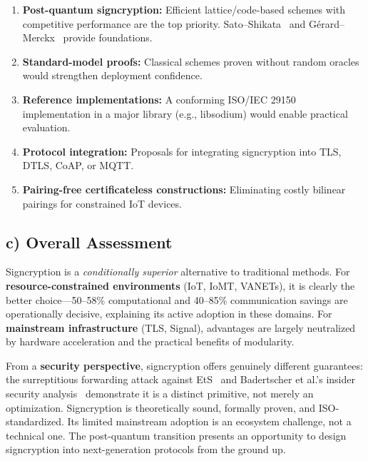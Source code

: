 \documentclass[11pt,a4paper]{article}
\begin{document}
\begin{enumerate}[label=\arabic*.]
    \item \textbf{Post-quantum signcryption:} Efficient lattice/code-based schemes with competitive performance are the top priority. Sato--Shikata~\cite{sato2018} and G\'{e}rard--Merckx~\cite{gerard2018} provide foundations.
    \item \textbf{Standard-model proofs:} Classical schemes proven without random oracles would strengthen deployment confidence.
    \item \textbf{Reference implementations:} A conforming ISO/IEC 29150~\cite{iso29150} implementation in a major library (e.g., libsodium) would enable practical evaluation.
    \item \textbf{Protocol integration:} Proposals for integrating signcryption into TLS, DTLS, CoAP, or MQTT.
    \item \textbf{Pairing-free certificateless constructions:} Eliminating costly bilinear pairings for constrained IoT devices.
\end{enumerate}

\subsection{c) Overall Assessment}

Signcryption is a \textit{conditionally superior} alternative to traditional methods. For \textbf{resource-constrained environments} (IoT, IoMT, VANETs), it is clearly the better choice---50--58\% computational and 40--85\% communication savings are operationally decisive, explaining its active adoption in these domains. For \textbf{mainstream infrastructure} (TLS, Signal), advantages are largely neutralized by hardware acceleration and the practical benefits of modularity.

From a \textbf{security perspective}, signcryption offers genuinely different guarantees: the surreptitious forwarding attack against EtS~\cite{baek2002} and Badertscher et al.'s insider security analysis~\cite{badertscher2018} demonstrate it is a distinct primitive, not merely an optimization. Signcryption is theoretically sound, formally proven, and ISO-standardized. Its limited mainstream adoption is an ecosystem challenge, not a technical one. The post-quantum transition presents an opportunity to design signcryption into next-generation protocols from the ground up.

\end{document}
